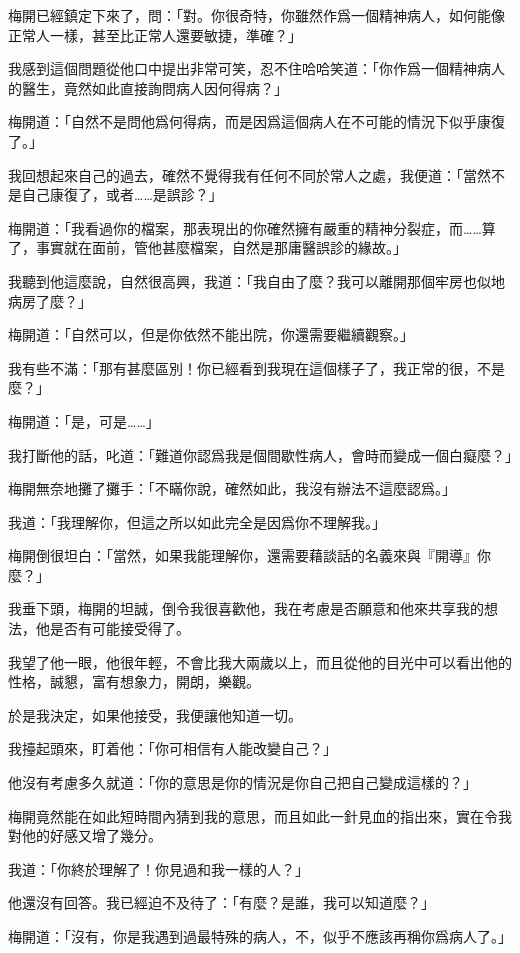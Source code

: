梅開已經鎮定下來了，問：「對。你很奇特，你雖然作爲一個精神病人，如何能像正常人一樣，甚至比正常人還要敏捷，準確？」

我感到這個問題從他口中提出非常可笑，忍不住哈哈笑道：「你作爲一個精神病人的醫生，竟然如此直接詢問病人因何得病？」

梅開道：「自然不是問他爲何得病，而是因爲這個病人在不可能的情況下似乎康復了。」

我回想起來自己的過去，確然不覺得我有任何不同於常人之處，我便道：「當然不是自己康復了，或者……是誤診？」

梅開道：「我看過你的檔案，那表現出的你確然擁有嚴重的精神分裂症，而……算了，事實就在面前，管他甚麼檔案，自然是那庸醫誤診的緣故。」

我聽到他這麼說，自然很高興，我道：「我自由了麼？我可以離開那個牢房也似地病房了麼？」

梅開道：「自然可以，但是你依然不能出院，你還需要繼續觀察。」

我有些不滿：「那有甚麼區別！你已經看到我現在這個樣子了，我正常的很，不是麼？」

梅開道：「是，可是……」

我打斷他的話，叱道：「難道你認爲我是個間歇性病人，會時而變成一個白癡麼？」

梅開無奈地攤了攤手：「不瞞你說，確然如此，我沒有辦法不這麼認爲。」



我道：「我理解你，但這之所以如此完全是因爲你不理解我。」

梅開倒很坦白：「當然，如果我能理解你，還需要藉談話的名義來與『開導』你麼？」

我垂下頭，梅開的坦誠，倒令我很喜歡他，我在考慮是否願意和他來共享我的想法，他是否有可能接受得了。

我望了他一眼，他很年輕，不會比我大兩歲以上，而且從他的目光中可以看出他的性格，誠懇，富有想象力，開朗，樂觀。

於是我決定，如果他接受，我便讓他知道一切。

我擡起頭來，盯着他：「你可相信有人能改變自己？」

他沒有考慮多久就道：「你的意思是你的情況是你自己把自己變成這樣的？」

梅開竟然能在如此短時間內猜到我的意思，而且如此一針見血的指出來，實在令我對他的好感又增了幾分。

我道：「你終於理解了！你見過和我一樣的人？」

他還沒有回答。我已經迫不及待了：「有麼？是誰，我可以知道麼？」

梅開道：「沒有，你是我遇到過最特殊的病人，不，似乎不應該再稱你爲病人了。」

